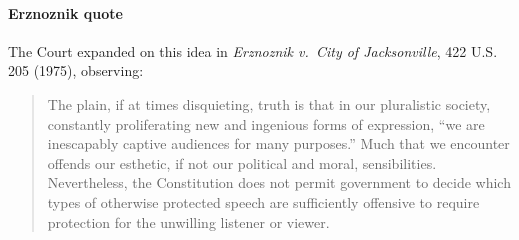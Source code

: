 \documentclass[12pt]{article}
\begin{document}
\paragraph{Erznoznik quote} The Court expanded on this idea in  {\em Erznoznik v.\ City of Jacksonville}, 422 U.S. 205 (1975), observing: 
\begin{quote}
The plain, if at times disquieting, truth is that in our pluralistic society, constantly proliferating new and ingenious forms of expression, ``we are inescapably captive audiences for many purposes.''  Much that we encounter offends our esthetic, if not our political and moral, sensibilities. Nevertheless, the Constitution does not permit government to decide which types of otherwise protected speech are sufficiently offensive to require protection for the unwilling listener or viewer.
\end{quote}
\end{document}
